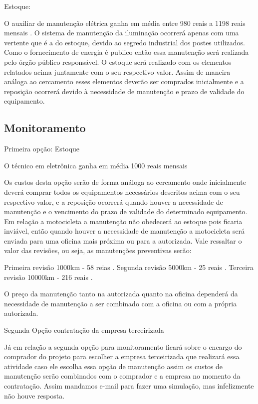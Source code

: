 Estoque:

O auxiliar de manutenção elétrica ganha em média entre 980 reais a 1198 reais mensais \cite{catho} .
	O sistema de manutenção da iluminação ocorrerá apenas com uma vertente que é a do estoque, devido ao segredo industrial dos postes utilizados. Como o fornecimento de energia é publico então essa manutenção será realizada pelo órgão público responsável.  O estoque será realizado com os elementos relatados acima juntamente com o seu respectivo valor. Assim de maneira análoga ao cercamento esses elementos deverão ser comprados inicialmente e a reposição ocorrerá devido à necessidade de manutenção e prazo de validade do equipamento.
	
\subsection{Monitoramento}

Primeira opção: Estoque

O técnico em eletrônica ganha em média 1000 reais mensais

	Os custos desta opção serão de forma análoga ao cercamento onde inicialmente deverá comprar todos os equipamentos necessários descritos acima com o seu respectivo valor, e a reposição ocorrerá quando houver a necessidade de manutenção e o vencimento do prazo de validade do determinado equipamento.
	Em relação a motocicleta a manutenção não obedecerá ao estoque pois ficaria inviável, então quando houver a necessidade de manutenção a motocicleta será enviada para uma oficina mais próxima ou para a autorizada. Vale ressaltar o valor das revisões, ou seja, as manutenções preventivas serão:
	
Primeira revisão 1000km - 58 reias \cite{yamaha} .
Segunda revisão 5000km - 25 reais \cite{yamaha} .
Terceira revisão 10000km - 216 reais \cite{yamaha} .

	O preço da manutenção tanto na autorizada quanto na oficina dependerá da necessidade de manutenção a ser combinado com a oficina ou com a própria autorizada.
	
Segunda Opção contratação da empresa terceirizada

	Já em relação a segunda opção para monitoramento ficará sobre o encargo do comprador do projeto para escolher a empresa terceirizada que realizará essa atividade caso ele escolha essa opção de manutenção assim os custos de manutenção serão combinados com o comprador e a empresa no momento da contratação. Assim mandamos e-mail para fazer uma simulação, mas infelizmente não houve resposta.
	

